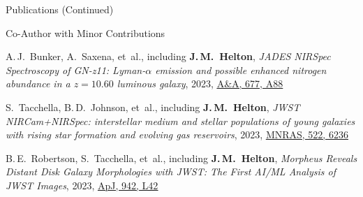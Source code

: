 \documentclass{JMH_CV}
\begin{document}
\begin{rSection}{Publications (Continued)}
\begin{rSubsection}{Co-Author with Minor Contributions}{}{}{}
\begin{etaremune}
    \item A.\,J.~Bunker, A.~Saxena, et~al., including \textbf{J.\,M.~Helton}, \textit{JADES NIRSpec \mbox{Spectroscopy} of GN-z11: Lyman-$\mathit{\alpha}$ emission and possible enhanced nitrogen \mbox{abundance} in a $\mathit{z = 10.60}$ luminous galaxy}, 2023, \href{https://www.scixplorer.org/abs/2023A&A...677A..88B/abstract}{\ul{A\&A, 677, A88}}

    \item S.~Tacchella, B.\,D.~Johnson, et~al., including \textbf{J.\,M.~Helton}, \textit{JWST \mbox{NIRCam+NIRSpec}: interstellar medium and stellar populations of young galaxies with rising star formation and evolving gas reservoirs}, 2023, \href{https://www.scixplorer.org/abs/2023MNRAS.522.6236T/abstract}{\ul{MNRAS, 522, 6236}}

    \item B.\,E.~Robertson, S.~Tacchella, et~al., including \textbf{J.\,M.~Helton}, \textit{Morpheus Reveals Distant Disk Galaxy Morphologies with JWST: The First AI/ML Analysis of JWST Images}, 2023, \href{https://www.scixplorer.org/abs/2023ApJ...942L..42R/abstract}{\ul{ApJ, 942, L42}}

\end{etaremune}
\end{rSubsection}

\end{rSection}

\end{document}
